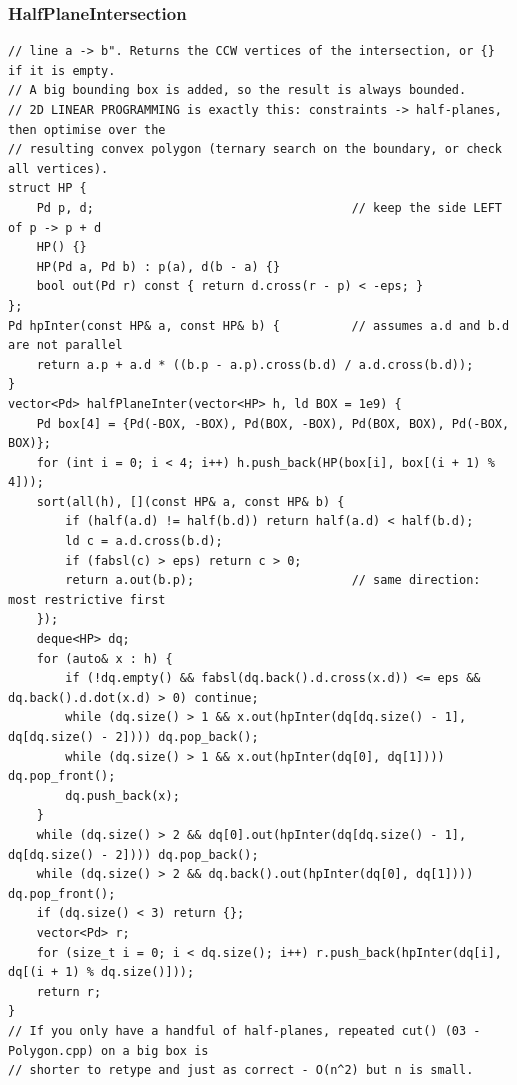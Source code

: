 \documentclass[9pt,a4paper,twocolumn]{extarticle}
\begin{document}
\subsubsection{HalfPlaneIntersection}
\nopagebreak
\begin{lstlisting}
// line a -> b". Returns the CCW vertices of the intersection, or {} if it is empty.
// A big bounding box is added, so the result is always bounded.
// 2D LINEAR PROGRAMMING is exactly this: constraints -> half-planes, then optimise over the
// resulting convex polygon (ternary search on the boundary, or check all vertices).
struct HP {
    Pd p, d;                                    // keep the side LEFT of p -> p + d
    HP() {}
    HP(Pd a, Pd b) : p(a), d(b - a) {}
    bool out(Pd r) const { return d.cross(r - p) < -eps; }
};
Pd hpInter(const HP& a, const HP& b) {          // assumes a.d and b.d are not parallel
    return a.p + a.d * ((b.p - a.p).cross(b.d) / a.d.cross(b.d));
}
vector<Pd> halfPlaneInter(vector<HP> h, ld BOX = 1e9) {
    Pd box[4] = {Pd(-BOX, -BOX), Pd(BOX, -BOX), Pd(BOX, BOX), Pd(-BOX, BOX)};
    for (int i = 0; i < 4; i++) h.push_back(HP(box[i], box[(i + 1) % 4]));
    sort(all(h), [](const HP& a, const HP& b) {
        if (half(a.d) != half(b.d)) return half(a.d) < half(b.d);
        ld c = a.d.cross(b.d);
        if (fabsl(c) > eps) return c > 0;
        return a.out(b.p);                      // same direction: most restrictive first
    });
    deque<HP> dq;
    for (auto& x : h) {
        if (!dq.empty() && fabsl(dq.back().d.cross(x.d)) <= eps && dq.back().d.dot(x.d) > 0) continue;
        while (dq.size() > 1 && x.out(hpInter(dq[dq.size() - 1], dq[dq.size() - 2]))) dq.pop_back();
        while (dq.size() > 1 && x.out(hpInter(dq[0], dq[1]))) dq.pop_front();
        dq.push_back(x);
    }
    while (dq.size() > 2 && dq[0].out(hpInter(dq[dq.size() - 1], dq[dq.size() - 2]))) dq.pop_back();
    while (dq.size() > 2 && dq.back().out(hpInter(dq[0], dq[1]))) dq.pop_front();
    if (dq.size() < 3) return {};
    vector<Pd> r;
    for (size_t i = 0; i < dq.size(); i++) r.push_back(hpInter(dq[i], dq[(i + 1) % dq.size()]));
    return r;
}
// If you only have a handful of half-planes, repeated cut() (03 - Polygon.cpp) on a big box is
// shorter to retype and just as correct - O(n^2) but n is small.
\end{lstlisting}
\end{document}
